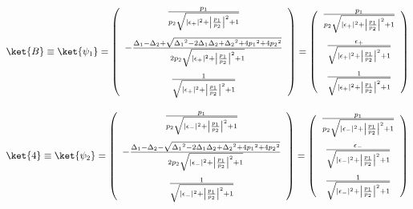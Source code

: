 \begin{equation}
     \ket{B}\equiv\ket{\psi_1}=\left(
        \begin{array}{c}
       \frac{{p_1}}{{p_2}\sqrt{
       |\epsilon_{+}|^2
       +\left|\frac{{p_1}}{{p_2}}\right|^2+1}}\\[20pt]
       -\frac{{\Delta_1}-{\Delta_2}+\sqrt{{\Delta_1}^2-2{\Delta_1}{\Delta_2}+{\Delta_2}^2+4{p_1}^2+4{p_2}^2}}{2{p_2}\sqrt{
       |\epsilon_{+}|^2
       +\left|\frac{{p_1}}{{p_2}}\right|^2+1}}\\[20pt]
       \frac{1}{\sqrt{
       |\epsilon_{+}|^2
       +\left|\frac{{p_1}}{{p_2}}\right|^2+1}}
        \end{array}
        \right)
        =\left(
        \begin{array}{c}
       \frac{{p_1}}{{p_2}\sqrt{
       |\epsilon_{+}|^2
       +\left|\frac{{p_1}}{{p_2}}\right|^2+1}}\\[20pt]
       \frac{\epsilon_+}{
       \sqrt{
       |\epsilon_{+}|^2
       +\left|\frac{{p_1}}{{p_2}}\right|^2+1}}\\[20pt]
       \frac{1}{\sqrt{
       |\epsilon_{+}|^2
       +\left|\frac{{p_1}}{{p_2}}\right|^2+1}}
        \end{array}
        \right)
\end{equation}

\begin{equation}
     \ket{4}\equiv\ket{\psi_2}=\left(
        \begin{array}{c}
       \frac{{p_1}}{{p_2}\sqrt{
       |\epsilon_{-}|^2
       +\left|\frac{{p_1}}{{p_2}}\right|^2+1}}\\[20pt]
       -\frac{{\Delta_1}-{\Delta_2}-\sqrt{{\Delta_1}^2-2{\Delta_1}{\Delta_2}+{\Delta_2}^2+4{p_1}^2+4{p_2}^2}}{2{p_2}\sqrt{
       |\epsilon_{-}|^2
       +\left|\frac{{p_1}}{{p_2}}\right|^2+1}}\\[20pt]
       \frac{1}{\sqrt{
       |\epsilon_{-}|^2
       +\left|\frac{{p_1}}{{p_2}}\right|^2+1}}\\[10pt]
        \end{array}
        \right)
    =\left(
        \begin{array}{c}
       \frac{{p_1}}{{p_2}\sqrt{
       |\epsilon_{-}|^2
       +\left|\frac{{p_1}}{{p_2}}\right|^2+1}}\\[20pt]
       \frac{
       \epsilon_-
       }{\sqrt{
       |\epsilon_{-}|^2
       +\left|\frac{{p_1}}{{p_2}}\right|^2+1}}\\[20pt]
       \frac{1}{\sqrt{
       |\epsilon_{-}|^2
       +\left|\frac{{p_1}}{{p_2}}\right|^2+1}}\\[10pt]
        \end{array}
        \right)
\end{equation}

